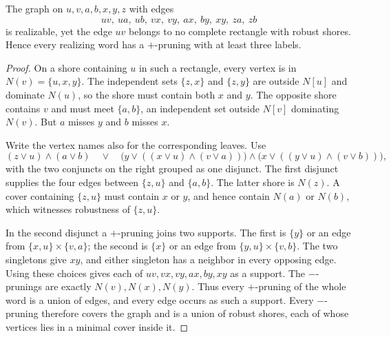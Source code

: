 \begin{proposition}
\label{core:prop:nonrectangular-prunings}
The graph on $u,v,a,b,x,y,z$ with edges
\[
 uv,\ ua,\ ub,\ vx,\ vy,\ ax,\ by,\ xy,\ za,\ zb
\]
is realizable, yet the edge $uv$ belongs to no complete rectangle
with robust shores. Hence every realizing word has a $+$-pruning
with at least three labels.
\end{proposition}
\begin{proof}
On a shore containing $u$ in such a rectangle, every vertex is
in $N(v)=\{u,x,y\}$. The independent sets $\{z,x\}$ and $\{z,y\}$
are outside $N[u]$ and dominate $N(u)$, so the shore must contain
both $x$ and $y$. The opposite shore contains $v$ and must meet
$\{a,b\}$, an independent set outside $N[v]$ dominating $N(v)$.
But $a$ misses $y$ and $b$ misses $x$.

Write the vertex names also for the corresponding leaves. Use
\[
 (z\lor u)\land(a\lor b)\quad\lor\quad
 \bigl(y\lor((x\lor u)\land(v\lor a))\bigr)
 \land
 \bigl(x\lor((y\lor u)\land(v\lor b))\bigr),
\]
with the two conjuncts on the right grouped as one disjunct.
The first disjunct supplies the four edges between $\{z,u\}$ and
$\{a,b\}$. The latter shore is $N(z)$. A cover containing $\{z,u\}$
must contain $x$ or $y$, and hence contain $N(a)$ or $N(b)$,
which witnesses robustness of $\{z,u\}$.

In the second disjunct a $+$-pruning joins two supports. The first
is $\{y\}$ or an edge from $\{x,u\}\times\{v,a\}$; the second
is $\{x\}$ or an edge from $\{y,u\}\times\{v,b\}$.
The two singletons give $xy$, and either singleton has a neighbor
in every opposing edge. Using these choices gives each of
$uv,vx,vy,ax,by,xy$ as a support. The $-$-prunings are exactly
$N(v),N(x),N(y)$. Thus every $+$-pruning of the whole word is a
union of edges, and every edge occurs as such a support. Every
$-$-pruning therefore covers the graph and is a union of robust
shores, each of whose vertices lies in a minimal cover inside it.
\end{proof}
